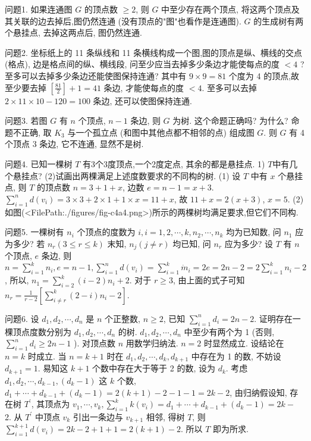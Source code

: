 
问题1. 如果连通图 $G$ 的顶点数 $\geqslant 2$, 则 $G$ 中至少存在两个顶点, 将这两个顶点及其关联的边去掉后,图仍然连通 (没有顶点的"图"也看作是连通图).
$G$ 的生成树有两个悬挂点, 去掉这两点后, 图仍然连通.



问题2. 坐标纸上的 11 条纵线和 11 条横线构成一个图,图的顶点是纵、横线的交点 (格点), 边是格点间的纵、横线段, 问至少应当去掉多少条边才能使每点的度 $<4$ ? 至多可以去掉多少条边还能使图保持连通?
其中有 $9 \times 9=81$ 个度为 4 的顶点,故至少要去掉 $\left[\frac{81}{2}\right]+1=41$ 条边, 才能使每点的度 $<4$. 至多可以去掉 $2 \times 11 \times 10-120=100$ 条边, 还可以使图保持连通.



问题3. 若图 $G$ 有 $n$ 个顶点, $n-1$ 条边, 则 $G$ 为树.
这个命题正确吗? 为什么?
命题不正确, 取 $K_3$ 与一个孤立点 (和图中其他点都不相邻的点) 组成图 $G$. 则 $G$ 有 4 个顶点 3 条边, 它不连通, 显然不是树.



问题4. 已知一棵树 $T$ 有3个3度顶点,一个2度定点, 其余的都是悬挂点.
1) $T$中有几个悬挂点? (2)试画出两棵满足上述度数要求的不同构的树.
(1) 设 $T$ 中有 $x$ 个悬挂点, 则 $T$ 的顶点数 $n=3+1+x$, 边数 $e=n- 1=x+3$. $\sum_{i=1}^n d\left(v_i\right)=3 \times 3+2 \times 1+1 \times x=11+x$, 故 $11+x=2(x+3)$, $x=5$.
(2) 如图(<FilePath:./figures/fig-c4a4.png>)所示的两棵树均满足要求,但它们不同构.



问题5. 一棵树有 $n_i$ 个顶点的度数为 $i, i=1,2, \cdots, k, n_2, \cdots, n_k$ 均为已知数, 问 $n_1$ 应为多少? 若 $n_r(3 \leqslant r \leqslant k)$ 末知, $n_j(j \neq r)$ 均已知, 问 $n_r$ 应为多少?
设 $T$ 有 $n$ 个顶点, $e$ 条边, 则 $n=\sum_{i=1}^k n_i, e=n-1, \sum_{i=1}^n d\left(v_i\right)=\sum_{i=1}^k \dot{m}_i= 2 e=2 n-2=2 \sum_{i=1}^k n_i-2$, 所以, $n_1=\sum_{i=2}^k(i-2) n_i+2$.
对于 $r \geqslant 3$, 由上面的式子可知 $n_r=\frac{1}{r-2}\left[\sum_{i \neq r}^k(2-i) n_i-2\right]$.



问题6. 设 $d_1, d_2, \cdots, d_n$ 是 $n$ 个正整数, $n \geqslant 2$, 已知 $\sum_{i=1}^n d_i=2 n-2$. 证明存在一棵顶点度数分别为 $d_1, d_2, \cdots, d_n$ 的树.
$d_1, d_2, \cdots, d_n$ 中至少有两个为 1 (否则, $\sum_{i=1}^n d_i \geqslant 2 n-1$ ). 对顶点数 $n$ 用数学归纳法.
$n=2$ 时显然成立.
设结论在 $n=k$ 时成立.
当 $n=k+1$ 时在 $d_1, d_2, \cdots, d_k, d_{k+1}$ 中存在为 1 的数, 不妨设 $d_{k+1}=1$. 易知这 $k+1$ 个数中存在大于等于 2 的数, 设为 $d_k$. 考虑 $d_1, d_2, \cdots, d_{k-1},\left(d_k-1\right)$ 这 $k$ 个数, $d_1+\cdots+d_{k-1}+\left(d_k-1\right)=2(k+1)-2-1-1=2 k-2$, 由归纳假设知, 存在树 $T^{\prime}$, 其顶点为 $v_1, \cdots, v_k, \sum_{i=1}^k k\left(v_i\right)=d_1+\cdots+d_{k-1}+\left(d_k-1\right)=2 k-$ 2. 从 $T^{\prime}$ 中顶点 $v_k$ 引出一条边与 $v_{k+1}$ 相邻, 得树 $T$, 则 $\sum_{i=1}^{k+1} d\left(v_i\right)=2 k-2+1+ 1=2(k+1)-2$. 所以 $T$ 即为所求.



